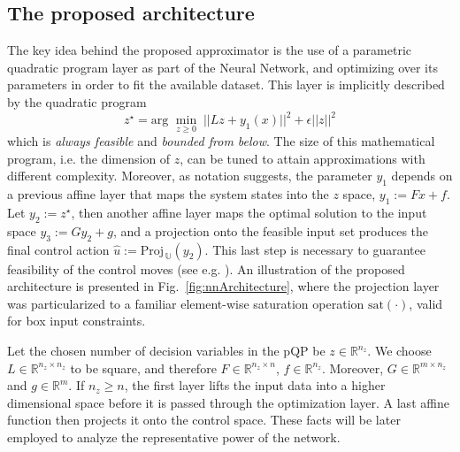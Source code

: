 \subsection{The proposed architecture}

The key idea behind the proposed approximator is the use of a parametric quadratic program layer as part of the Neural Network, and optimizing over its parameters in order to fit the available dataset. This layer is implicitly described by the quadratic program
\begin{equation}
	\label{eq:pQP}
	z^\star = \text{arg }\min_{z \geq 0} \; ||Lz + y_1(x)||^{2} + \epsilon ||z||^2
\end{equation}
which is \textit{always feasible} and \textit{bounded from below}. The size of this mathematical program, i.e. the dimension of $z$, can be tuned to attain approximations with different complexity. Moreover, as notation suggests, the parameter $y_1$ depends on a previous affine layer that maps the system states into the $z$ space, $y_1 := Fx + f$. Let $y_2 := z^{\star}$, then another affine layer maps the optimal solution to the input space $y_3 := Gy_2 + g$, and a projection onto the feasible input set produces the final control action $\hat{u} := \text{Proj}_{\, \mathbb{U}}(y_2)$. This last step is necessary to guarantee feasibility of the control moves (see e.g. \cite{chen2018approximating}). An illustration of the proposed architecture is presented in Fig.~\ref{fig:nnArchitecture}, where the projection layer was particularized to a familiar element-wise saturation operation $\text{sat}(\cdot)$, valid for box input constraints.


Let the chosen number of decision variables in the pQP be $z \in \mathbb{R}^{n_z}$. We choose $L \in \mathbb{R}^{n_z \times n_z}$ to be square, and therefore $F \in \mathbb{R}^{n_z \times n}$, $f \in \mathbb{R}^{n_z}$. Moreover, $G \in \mathbb{R}^{m \times n_z}$ and $g \in \mathbb{R}^{m}$. If $n_z \ge n$, the first layer lifts the input data into a higher dimensional space before it is passed through the optimization layer. A last affine function then projects it onto the control space. These facts will be later employed to analyze the representative power of the network.

